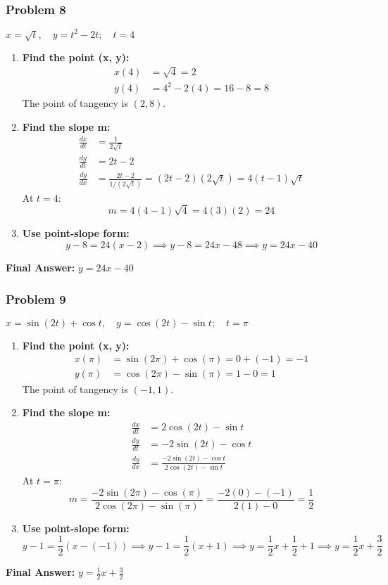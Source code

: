 \documentclass{article}
\begin{document}
\subsubsection{Problem 8}
$x = \sqrt{t}, \quad y = t^2 - 2t; \quad t = 4$
\begin{enumerate}
    \item \textbf{Find the point (x, y):}
    \begin{align*}
    x(4) &= \sqrt{4} = 2 \\
    y(4) &= 4^2 - 2(4) = 16 - 8 = 8
    \end{align*}
    The point of tangency is $(2, 8)$.
    \item \textbf{Find the slope m:}
    \begin{align*}
    \frac{dx}{dt} &= \frac{1}{2\sqrt{t}} \\
    \frac{dy}{dt} &= 2t - 2 \\
    \frac{dy}{dx} &= \frac{2t - 2}{1/(2\sqrt{t})} = (2t-2)(2\sqrt{t}) = 4(t-1)\sqrt{t}
    \end{align*}
    At $t=4$:
    \[ m = 4(4-1)\sqrt{4} = 4(3)(2) = 24 \]
    \item \textbf{Use point-slope form:}
    \[ y - 8 = 24(x - 2) \implies y - 8 = 24x - 48 \implies y = 24x - 40 \]
\end{enumerate}
\textbf{Final Answer:} $y = 24x - 40$

\subsubsection{Problem 9}
$x = \sin(2t) + \cos t, \quad y = \cos(2t) - \sin t; \quad t = \pi$
\begin{enumerate}
    \item \textbf{Find the point (x, y):}
    \begin{align*}
    x(\pi) &= \sin(2\pi) + \cos(\pi) = 0 + (-1) = -1 \\
    y(\pi) &= \cos(2\pi) - \sin(\pi) = 1 - 0 = 1
    \end{align*}
    The point of tangency is $(-1, 1)$.
    \item \textbf{Find the slope m:}
    \begin{align*}
    \frac{dx}{dt} &= 2\cos(2t) - \sin t \\
    \frac{dy}{dt} &= -2\sin(2t) - \cos t \\
    \frac{dy}{dx} &= \frac{-2\sin(2t) - \cos t}{2\cos(2t) - \sin t}
    \end{align*}
    At $t=\pi$:
    \[ m = \frac{-2\sin(2\pi) - \cos(\pi)}{2\cos(2\pi) - \sin(\pi)} = \frac{-2(0) - (-1)}{2(1) - 0} = \frac{1}{2} \]
    \item \textbf{Use point-slope form:}
    \[ y - 1 = \frac{1}{2}(x - (-1)) \implies y - 1 = \frac{1}{2}(x+1) \implies y = \frac{1}{2}x + \frac{1}{2} + 1 \implies y = \frac{1}{2}x + \frac{3}{2} \]
\end{enumerate}
\textbf{Final Answer:} $y = \frac{1}{2}x + \frac{3}{2}$
\end{document}
